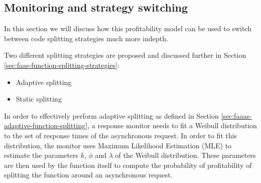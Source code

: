 \subsection{Monitoring and strategy switching}
\label{sec:faaas-monitoring-and-strat-switching-design}
In this section we will discuss how this profitability model can be used to switch between code splitting strategies much more indepth.

Two different splitting strategies are proposed and discussed further in Section \ref{sec:faas-function-splitting-strategies}:

\begin{itemize}
    \item Adaptive splitting
    \item Static splitting
\end{itemize}

In order to effectively perform adaptive splitting as defined in Section \ref{sec:faaas-adaptive-function-splitting}, a response monitor needs to fit a Weibull distribution to the set of response times of the asynchronous request. In order to fit this distribution, the monitor uses Maximum Likelihood Estimation (MLE) to estimate the parameters $k$, $\phi$ and $\lambda$ of the Weibull distribution. These parameters are then used by the function itself to compute the probability of profitability of splitting the function around an asynchronous request.
